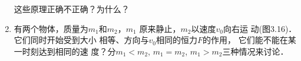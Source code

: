 \begin{exercises}
\begin{enumerate}
          这些原理正确不正确？为什么？

    \item    有两个物体，质量为$m_1$和$m_2$，$m_1$
          原来静止，$m_2$以速度$v_0$向右运
          动(图3.16)．它们同时开始受到大小
          相等、方向与$v_0$相同的恒力$F$的作用，
          它们能不能在某一时刻达到相同的速
          度？分$m_1<m_2$, $m_1=m_2$, $m_1>m_2$三种情况来讨论．
          \begin{figure}[H]\centering
              \caption{}
          \end{figure}
\end{enumerate}
\end{exercises}






















